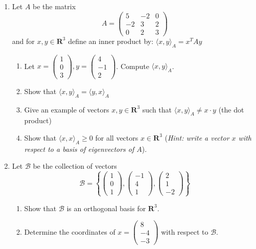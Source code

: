 \documentclass[12pt]{article}
\numberwithin{equation}{subsection}
\numberwithin{figure}{subsection}
\theoremstyle{note}
\newcommand{\R}{\mathbf{R}}
\newcommand\ip[2]{\langle #1, #2\rangle}
\begin{document}
\begin{enumerate}[label=\arabic*.]
\item Let $A$ be the matrix \[ A=\begin{pmatrix} 5 & -2 & 0\\ -2 & 3 & 2 \\ 0 & 2 & 3 \end{pmatrix}\] 
and for $x,y\in \R^3$ define an inner product by: $\ip{x}{y}_A= x^TAy$
\begin{enumerate}
	\item Let $x=\begin{pmatrix} 1\\0\\3\end{pmatrix}, y=\begin{pmatrix} 4 \\ -1 \\2\end{pmatrix}$. Compute $\ip{x}{y}_A$.
	\item Show that $\ip{x}{y}_A=\ip{y}{x}_A$
	\item Give an example of vectors $x,y\in \R^3$ such that $\ip{x}{y}_A\neq x\cdot y$ (the dot product)
	\item Show that $\ip{x}{x}_A\geq 0$ for all vectors $x\in \R^3$ (\textit{Hint: write a vector $x$ with respect to a basis of eigenvectors of $A$}).
\end{enumerate}

\item Let $\mathcal{B}$ be the collection of vectors \[ \mathcal{B}=\left \{ \begin{pmatrix} 1 \\  0 \\1\end{pmatrix}, \begin{pmatrix} -1 \\ 4 \\ 1\end{pmatrix}, \begin{pmatrix} 2 \\ 1 \\ -2\end{pmatrix}\right\}\] 
\begin{enumerate}
	\item Show that $\mathcal{B}$ is an orthogonal basis for $\R^3$.
	\item Determine the coordinates of $x=\begin{pmatrix} 8 \\ -4 \\-3\end{pmatrix}$ with respect to $\mathcal{B}$. 


\end{enumerate}
\end{enumerate}
\end{document}
